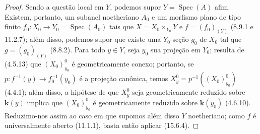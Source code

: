 \begin{proof}
Sendo a questão local em $Y$, podemos supor $Y=\operatorname{Spec}(A)$ afim. Existem, portanto, um subanel noetheriano $A_0$ e um morfismo plano de tipo finito $f_0:X_0\to Y_0=\operatorname{Spec}(A_0)$ tais que $X=X_0\times_{Y_0}Y$ e $f=(f_0)_{(Y)}$ (8.9.1 e 11.2.7); além disso, podemos supor que existe uma $Y_0$-seção $g_0$ de $X_0$ tal que $g=(g_0)_{(Y)}$ (8.8.2). Para todo $y\in Y$, seja $y_0$ sua projeção em $Y_0$; resulta de (4.5.13) que $(X_0)_{y_0}^0$ é geometricamente conexo; portanto, se $p:f^{-1}(y)\to f_0^{-1}(y_0)$ é a projeção canônica, temos $X_y^0=p^{-1}((X_0)_{y_0}^0)$ (4.4.1); além disso, a hipótese de que $X_y^0$ seja geometricamente reduzido sobre $\mathbf{k}(y)$ implica que $(X_0)_{y_0}^0$ é geometricamente reduzido sobre $\mathbf{k}(y_0)$ (4.6.10). Reduzimo-nos assim ao caso em que supomos
além disso $Y$ noetheriano; como $f$ é universalmente aberto (11.1.1), basta então aplicar (15.6.4).
\end{proof}

